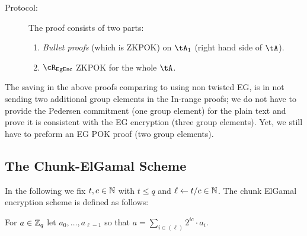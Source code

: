\begin{description}
\begin{description}
		\item[Protocol:]  The proof consists of two parts:
		\begin{enumerate}
			\item  \textit{Bullet proofs} \cite{SP:BBBPWM18}  (which is  ZKPOK) on $\tA_1$ (\ie right hand side of $\tA$).   
			
			
			
			\item   $\rEgEnc$ ZKPOK  for the whole $\tA$.
		\end{enumerate}
		
	\end{description}

\end{description}



\begin{remark}[Efficiency]
	The saving in the above proofs comparing to using non twisted EG, is in not sending two additional   group elements in the In-range proofs;  we do not have to provide the Pedersen commitment (one group element)  for the plain text and prove it is consistent with the EG encryption (three group elements). Yet, we still have to preform an EG POK proof (two group elements).
\end{remark}	

	
\subsection{The Chunk-ElGamal  Scheme}\label{sec:ChanksEg:EgScheme}
In the following we fix $t,c\in {\mathbb{N}}$ with $t\le q$ and $\ell \leftarrow t/c \in {\mathbb{N}}$. The chunk ElGamal encryption scheme  is defined as follows:



\begin{definition}\label{def:basefactor}
For $a\in {\mathbb Z}_q$ let $a_0,\ldots,a_{\ell-1}$ so that $a =  \sum_{i \in (\ell)}    2^{i c} \cdot a_i$.
\end{definition}


